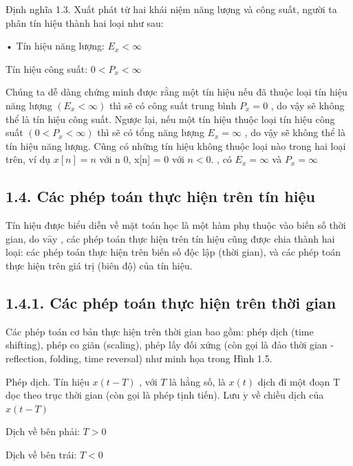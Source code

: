 \documentclass[
  10
]{article}
\begin{document}
Định nghĩa 1.3. Xuất phát từ hai khái niệm năng lượng và công suất,
người ta phân tín hiệu thành hai loại như sau:

• Tín hiệu năng lượng: \(E _ { x } < \infty\)

Tín hiệu công suất: \(0 < P _ { x } < \infty\)

Chúng ta dễ dàng chứng minh được rằng một tín hiệu nếu đã thuộc loại tín
hiệu năng lượng \(( E _ { x } < \infty )\) thì sẽ có công suất trung
bình \(P _ { x } = 0\) , do vậy sẽ không thể là tín hiệu công suất.
Ngược lại, nếu một tín hiệu thuộc loại tín hiệu công suất
\(( 0 < P _ { x } < \infty )\) thì sẽ có tổng năng lượng
\(E _ { x } = \infty\) , do vậy sẽ không thể là tín hiệu năng lượng.
Cũng có những tín hiệu không thuộc loại nào trong hai loại trên, ví dụ
\(x [ n ] = n\) với n 0, x{[}n{]} = 0 với \(n < 0 .\) , có
\(E _ { x } = \infty\) và \(P _ { x } = \infty\)

\subsection{1.4. Các phép toán thực hiện trên tín
hiệu}\label{cuxe1c-phuxe9p-touxe1n-thux1ef1c-hiux1ec7n-truxean-tuxedn-hiux1ec7u}

Tín hiệu được biểu diễn về mặt toán học là một hàm phụ thuộc vào biến số
thời gian, do \(\mathrm { v } \mathrm { \hat { a } \mathrm { y } }\) ,
các phép toán thực hiện trên tín hiệu cũng được chia thành hai loại: các
phép toán thực hiện trên biến số độc lập (thời gian), và các phép toán
thực hiện trên giá trị (biên độ) của tín hiệu.

\subsection{1.4.1. Các phép toán thực hiện trên thời
gian}\label{cuxe1c-phuxe9p-touxe1n-thux1ef1c-hiux1ec7n-truxean-thux1eddi-gian}

Các phép toán cơ bản thực hiện trên thời gian bao gồm: phép dịch (time
shifting), phép co giãn (scaling), phép lấy đối xứng (còn gọi là đảo
thời gian - reflection, folding, time reversal) như minh họa trong Hình
1.5.

Phép dịch. Tín hiệu \(x ( t - T )\) , với \(T\) là hằng số, là
\(x ( t )\) dịch đi một đoạn T dọc theo trục thời gian (còn gọi là phép
tịnh tiến). Lưu \(\acute { \mathrm { y } }\) về chiều dịch của
\(x ( t - T )\)

Dịch về bên phải: \(T > 0\)

Dịch về bên trái: \(T < 0\)
\end{document}
